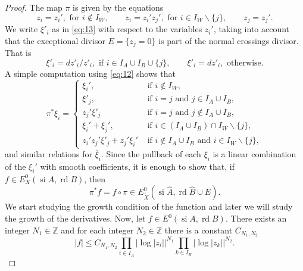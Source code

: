 \documentclass[10pt,a4paper]{amsart}
\newcommand{\Z}{\mathds{Z}}
\DeclareMathOperator{\rd}{rd}
\DeclareMathOperator{\si}{si}
\begin{document}
\begin{proof}
  The map $\pi $ is given by the equations
  \begin{equation}\label{eq:12}
    z_{i}=z_{i}', \text{ for }i\not \in I_{W},\qquad 
    z_{i}=z_{i}'z_{j}', \text{ for }i \in I_{W}\smallsetminus \{j\},\qquad
    z_{j}=z_{j}'.
  \end{equation}
  We write $\xi'_{i}$ as in \eqref{eq:13} with respect to the
  variables $z_{i}'$, taking into account that the exceptional divisor
  $E=\{z_{j}=0\}$ is part of the normal crossings divisor.  That is
  \begin{displaymath}
    \xi'_{i}=dz'_{i}/z'_{i},\text{ if }i\in I_{A}\cup
    I_{B}\cup\{j\},\qquad
    \xi'_{i}=dz'_{i},\text{ otherwise.}
  \end{displaymath}
  A simple computation using \eqref{eq:12} shows that 
  \begin{equation}\label{eq:14}
    \pi ^{\ast}\xi_{i}=
    \begin{cases}
      \xi_{i}',&\text{ if }i\not \in I_{W},\\
      \xi'_{j},&\text{ if }i=j\text{ and }j\in I_{A}\cup I_{B},\\
      z_{j}'\xi'_{j} &\text{ if }i=j\text{ and }j\not \in I_{A}\cup I_{B},\\
       \xi_{i}'+\xi_{j}',&\text{ if }i\in (I_{A}\cup I_{B})\cap
                           I_{W}\smallsetminus \{j\},\\
      z_{i}'z_{j}'\xi'_{j}+z_{j}'\xi_{i}'&\text{ if }i\not \in I_{A}\cup
                                           I_{B}\text{ and } i\in  I_{W}\smallsetminus \{j\},
    \end{cases}
  \end{equation}
and similar relations for $\overline{\xi}_{i}$. Since the pullback of
each $\xi_{i}$ is a linear combination of the $\xi_{i}'$  with smooth
coefficients, it is enough to show that, if $f\in E_{X}^0(\si A,\rd
B)$, then
\begin{displaymath}
  \pi ^{\ast}f = f\circ \pi \in E_{\widetilde X}^0(\si \widehat A,\rd \widehat B\cup E).
\end{displaymath}
We start studying the growth condition of the function and later we
will study the growth of the derivatives. 
  Now, let $f\in E^{0}(\si A, \rd B)$. There exists an integer $N_1\in
  \Z$ and for each integer $N_2\in \Z$  there is a
  constant $C_{N_1,N_2}$
\begin{displaymath}
 \left | f
    \right|\le C_{N_1,N_2}
    \prod_{i\in I_A}|\log|z_i||^{N_1}
    \prod_{k\in I_B}|\log|z_k||^{N_2}.
  \end{displaymath}

\end{proof}
\end{document}
